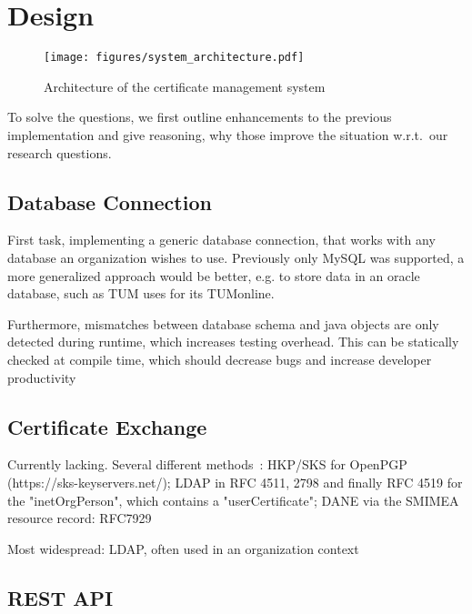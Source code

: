 \chapter{Design}\label{ch:design}

\begin{figure}
    \centering
    \texttt{[image: figures/system\_architecture.pdf]}
    \caption{Architecture of the certificate management system}
    \label{fig:systemArchitecture}
\end{figure}

To solve the questions, we first outline enhancements to the previous implementation and give reasoning, why those
improve the situation w.r.t.\ our research questions.

\section{Database Connection}\label{sec:databaseConnection}
First task, implementing a generic database connection, that works with any database an organization wishes to use.
Previously only MySQL was supported, a more generalized approach would be better, e.g. to store data in an oracle
database, such as TUM uses for its TUMonline.

Furthermore, mismatches between database schema and java objects are only detected during runtime, which increases
testing overhead.
This can be statically checked at compile time, which should decrease bugs and increase developer productivity

\section{Certificate Exchange}\label{sec:certificateExchange}
Currently lacking.
Several different methods~\cite{haunerIdp}:
HKP/SKS for OpenPGP (https://sks-keyservers.net/);
LDAP in RFC 4511, 2798 and finally RFC 4519 for the "inetOrgPerson", which contains a "userCertificate";
DANE via the SMIMEA resource record: RFC7929

Most widespread: LDAP, often used in an organization context

\section{REST API}\label{sec:restApi}

